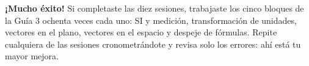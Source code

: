 \documentclass[12pt, letterpaper]{article}
\begin{document}
\vspace{10pt}
\begin{cuadroinfo}
  \small
  \textbf{¡Mucho éxito!} Si completaste las diez sesiones, trabajaste los cinco bloques de la Guía 3 ochenta veces cada uno: SI y medición, transformación de unidades, vectores en el plano, vectores en el espacio y despeje de fórmulas. Repite cualquiera de las sesiones cronometrándote y revisa solo los errores: ahí está tu mayor mejora.
\end{cuadroinfo}

\fi
\end{document}
